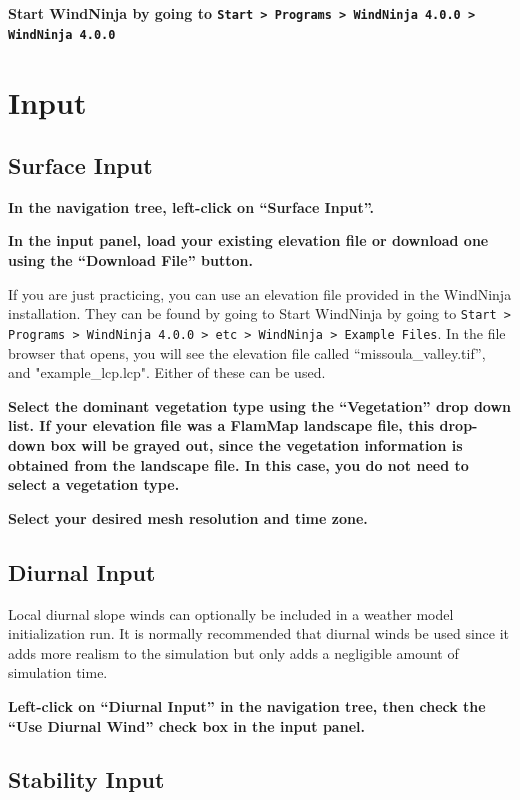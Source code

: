 \documentclass[12pt]{article}
\newcommand\vn{4.0.0}
\begin{document}
\textbf{\color{red}Start WindNinja by going to \texttt{Start > Programs > WindNinja \vn{} > WindNinja \vn{}}}

\section{Input}
\subsection{Surface Input}

\textbf{\color{red} In the navigation tree, left-click on “Surface Input”.}

\textbf{\color{red} In the input panel, load your existing elevation file or download one using the “Download File” button.}

If you are just practicing, you can use an elevation file provided in the WindNinja installation.  
They can be found by going to Start WindNinja by going to \texttt{Start > Programs > WindNinja \vn{} > etc > WindNinja > Example Files}. 
In the file browser that opens, you will see the elevation file called “missoula\_valley.tif”, and "example\_lcp.lcp". 
Either of these can be used.

\textbf{\color{red} Select the dominant vegetation type using the “Vegetation” drop down list.  
If your elevation file was a FlamMap landscape file, this drop-down box will be grayed out, since the vegetation information is obtained from the landscape file.  
In this case, you do not need to select a vegetation type.}

\textbf{\color{red} Select your desired mesh resolution and time zone.}

\subsection{Diurnal Input}

Local diurnal slope winds can optionally be included in a weather model initialization run.  
It is normally recommended that diurnal winds be used since it adds more realism to the simulation but only adds a negligible amount of simulation time.

\textbf{\color{red} Left-click on “Diurnal Input” in the navigation tree, then check the “Use Diurnal Wind” check box in the input panel.}

\subsection{Stability Input}
\end{document}
